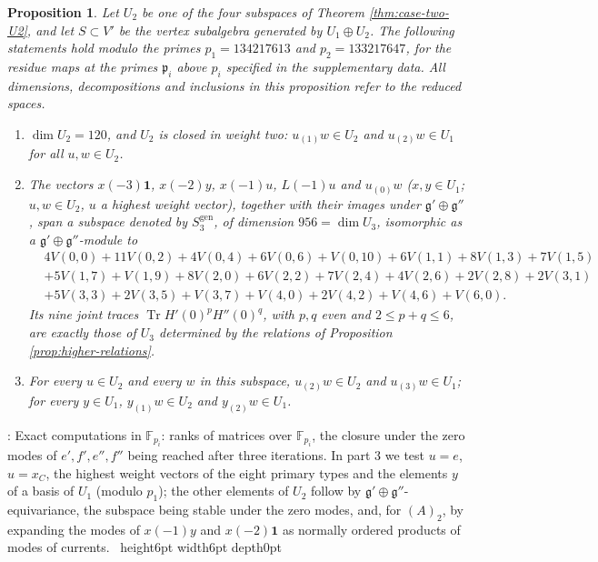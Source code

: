 \documentclass[leqno]{article}
\renewcommand{\leq}{\ensuremath{\leqslant}}
\newcommand{\qed}{\hfill \vrule height6pt  width6pt depth0pt}
\newtheorem{prop}[thm]{Proposition}
\newenvironment{proof}[1][]{\noindent {\it Proof #1} : }{\hbox{~}\qed
\smallskip
}
\numberwithin{equation}{section}
\begin{document}
\begin{prop}
\label{prop:case-two-weight-three}
Let $U_2$ be one of the four subspaces of Theorem \ref{thm:case-two-U2}, and let $S \subset V'$ be the vertex subalgebra generated by $U_1 \oplus U_2$. The following statements hold modulo the primes $p_1 = 134217613$ and $p_2 = 133217647$, for the residue maps at the primes $\mathfrak p_i$ above $p_i$ specified in the supplementary data. All dimensions, decompositions and inclusions in this proposition refer to the reduced spaces.
\begin{enumerate}
\item $\dim U_2 = 120$, and $U_2$ is closed in weight two: $u_{(1)}w \in U_2$ and $u_{(2)}w \in U_1$ for all $u,w \in U_2$.
\item The vectors $x(-3)\mathbf 1$, $x(-2)y$, $x(-1)u$, $L(-1)u$ and $u_{(0)}w$ ($x,y \in U_1$; $u,w \in U_2$, $u$ a highest weight vector), together with their images under $\mathfrak g' \oplus \mathfrak g''$, span a subspace denoted by $S_3^{\mathrm{gen}}$, of dimension $956 = \dim U_3$, isomorphic as a $\mathfrak g' \oplus \mathfrak g''$-module to
\[
\begin{aligned}
&4V(0,0)+11V(0,2)+4V(0,4)+6V(0,6)+V(0,10)+6V(1,1)+8V(1,3)+7V(1,5)\\
&+5V(1,7)+V(1,9)+8V(2,0)+6V(2,2)+7V(2,4)+4V(2,6)+2V(2,8)+2V(3,1)\\
&+5V(3,3)+2V(3,5)+V(3,7)+V(4,0)+2V(4,2)+V(4,6)+V(6,0).
\end{aligned}
\]
Its nine joint traces $\operatorname{Tr}H'(0)^pH''(0)^q$, with $p,q$ even and $2 \leq p+q \leq 6$, are exactly those of $U_3$ determined by the relations of Proposition \ref{prop:higher-relations}.
\item For every $u \in U_2$ and every $w$ in this subspace, $u_{(2)}w \in U_2$ and $u_{(3)}w \in U_1$; for every $y \in U_1$, $y_{(1)}w \in U_2$ and $y_{(2)}w \in U_1$.
\end{enumerate}
\end{prop}

\begin{proof}
Exact computations in $\mathbb F_{p_i}$: ranks of matrices over $\mathbb F_{p_i}$, the closure under the zero modes of $e',f',e'',f''$ being reached after three iterations. In part 3 we test $u = e$, $u = x_C$, the highest weight vectors of the eight primary types and the elements $y$ of a basis of $U_1$ (modulo $p_1$); the other elements of $U_2$ follow by $\mathfrak g' \oplus \mathfrak g''$-equivariance, the subspace being stable under the zero modes, and, for $(A)_2$, by expanding the modes of $x(-1)y$ and $x(-2)\mathbf 1$ as normally ordered products of modes of currents.
\end{proof}
\end{document}

